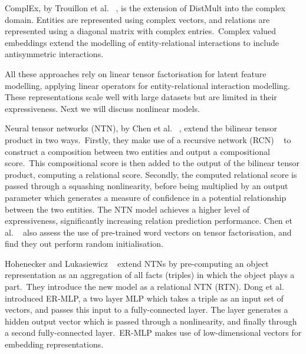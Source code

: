 \noindent ComplEx, by Trouillon et al. \unskip~\citep{trouillon2016complex}, is the extension of DistMult into the complex domain. Entities are represented using complex vectors, and relations are represented using a diagonal matrix with complex entries.\ Complex valued embeddings extend the modelling of entity-relational interactions to include antisymmetric interactions. \par

\noindent All these approaches rely on linear tensor factorisation for latent feature modelling, applying linear operators for entity-relational interaction modelling. These representations scale well with large datasets but are limited in their expressiveness. Next we will discuss nonlinear models. \par

\noindent Neural tensor networks (NTN), by Chen et al. \unskip~\citep{socher2013reasoning}, extend the bilinear tensor product in two ways.\ Firstly, they make use of a recursive network (RCN) \unskip~\citep{socher2012semantic} to construct a composition between two entities and output a compositional score.\ This compositional score is then added to the output of the bilinear tensor product, computing a relational score. Secondly, the computed relational score is passed through a squashing nonlinearity, before being multiplied by an output parameter which generates a measure of confidence in a potential relationship between the two entities. The NTN model achieves a higher level of expressiveness, significantly increasing relation prediction performance. Chen et al. \unskip~\citep{socher2013reasoning} also assess the use of pre-trained word vectors on tensor factorisation, and find they out perform random initialisation. \par

\noindent Hohenecker and Lukasiewicz \unskip~\citep{hohenecker2017deep} extend NTNs by pre-computing an object representation as an aggregation of all facts (triples) in which the object plays a part.\ They introduce the new model as a relational NTN (RTN). Dong et al. \unskip~\citep{dong2014knowledge} introduced ER-MLP, a two layer MLP which takes a triple as an input set of vectors, and passes this input to a fully-connected layer. The layer generates a hidden output vector which is passed through a nonlinearity, and finally through a second fully-connected layer.\ ER-MLP makes use of low-dimensional vectors for embedding representations. \par

